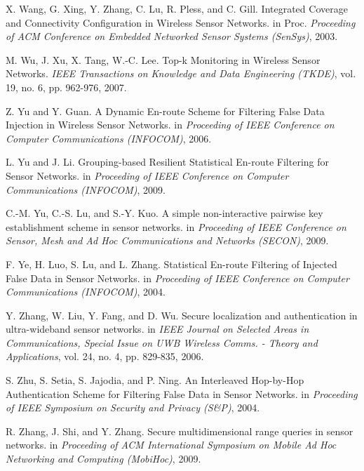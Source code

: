 \documentclass[conference]{IEEEtran}
\begin{document}
\begin{thebibliography}{1}
X. Wang, G. Xing, Y. Zhang, C. Lu, R. Pless, and C. Gill. Integrated Coverage and Connectivity Configuration in Wireless Sensor Networks. in Proc. \emph{Proceeding of ACM Conference on Embedded Networked Sensor Systems (SenSys)}, 2003.

M. Wu, J. Xu, X. Tang, W.-C. Lee. Top-k Monitoring in Wireless Sensor Networks. \emph{IEEE Transactions on Knowledge and Data Engineering (TKDE)}, vol. 19, no. 6, pp. 962-976, 2007.

Z. Yu and Y. Guan. A Dynamic En-route Scheme for Filtering False Data Injection in Wireless Sensor Networks. in \emph{Proceeding of IEEE Conference on Computer Communications (INFOCOM)}, 2006.

L. Yu and J. Li. Grouping-based Resilient Statistical En-route Filtering for Sensor Networks. in \emph{Proceeding of IEEE Conference on Computer Communications (INFOCOM)}, 2009.

C.-M. Yu, C.-S. Lu, and S.-Y. Kuo. A simple non-interactive pairwise key establishment scheme in sensor networks. in \emph{Proceeding of IEEE Conference on Sensor, Mesh and Ad Hoc Communications and Networks (SECON)}, 2009.

F. Ye, H. Luo, S. Lu, and L. Zhang. Statistical En-route Filtering of Injected False Data in Sensor Networks. in \emph{Proceeding of IEEE Conference on Computer Communications (INFOCOM)}, 2004.

Y. Zhang, W. Liu, Y. Fang, and D. Wu. Secure localization and authentication in ultra-wideband sensor networks. in \emph{IEEE Journal on Selected Areas in Communications, Special Issue on UWB Wireless Comms. - Theory and Applications}, vol. 24, no. 4, pp. 829-835, 2006.

S. Zhu, S. Setia, S. Jajodia, and P. Ning. An Interleaved Hop-by-Hop Authentication Scheme for Filtering False Data in Sensor Networks. in \emph{Proceeding of IEEE Symposium on Security and Privacy (S\&P)}, 2004.

R. Zhang, J. Shi, and Y. Zhang. Secure multidimensional range queries in sensor networks. in \emph{Proceeding of ACM International Symposium on Mobile Ad Hoc Networking and Computing (MobiHoc)}, 2009.

\end{thebibliography}
\end{document}

